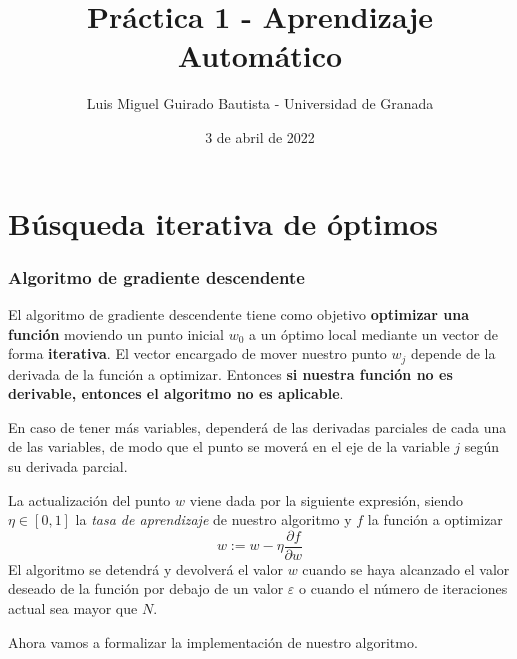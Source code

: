 \documentclass{article}
\title{Práctica 1 - Aprendizaje Automático}
\author{Luis Miguel Guirado Bautista - Universidad de Granada}
\date{3 de abril de 2022}
\begin{document}
    \begin{titlepage}
        \maketitle
    \end{titlepage}

    \pagebreak

    \tableofcontents

    \pagebreak 

    \part{Búsqueda iterativa de óptimos}
    \section{Algoritmo de gradiente descendente}
    \raggedright
    El algoritmo de gradiente descendente tiene como objetivo \textbf{optimizar una función} moviendo
    un punto inicial $w_0$ a un óptimo local mediante un vector
    de forma \textbf{iterativa}. El vector encargado de mover nuestro punto $w_j$ depende de la derivada de la
    función a optimizar. Entonces \textbf{si nuestra función no es derivable, entonces el algoritmo no es aplicable}. \par
    En caso de tener más variables, dependerá de las derivadas parciales de cada una de las variables,
    de modo que el punto se moverá en el eje de la variable $j$ según su derivada parcial. \par
    \vspace*{0.2in}
    La actualización del punto $w$ viene dada por la siguiente expresión, siendo $\eta \in \left[0,1\right]$ la \emph{tasa de aprendizaje}
    de nuestro algoritmo y $f$ la función a optimizar
    \begin{equation*}
        w := w - \eta \frac{\partial f}{\partial w}
    \end{equation*}
    El algoritmo se detendrá y devolverá el valor $w$ cuando se haya alcanzado el valor deseado de la función por debajo de un
    valor $\varepsilon$ o cuando el número de iteraciones actual sea mayor que $N$. \par
    Ahora vamos a formalizar la implementación de nuestro algoritmo. \par
    \vspace{0.2in}
    \begin{algorithmic}
        \EndWhile
        \EndFunction
    \end{algorithmic}
\end{document}
